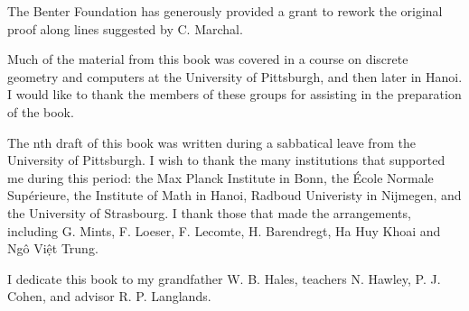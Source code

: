 The Benter Foundation has generously provided a grant to rework the original
proof along lines suggested by C. Marchal.

Much of the material from this book was covered
in a course on discrete geometry and computers at the University of
Pittsburgh, and then later %
in Hanoi.  I would like to thank the members of these
groups for assisting in the preparation of the book.

The nth draft of this book was written during a sabbatical leave from the
University of Pittsburgh.  I wish to thank the many institutions that
supported me during this period: the Max Planck Institute in Bonn, the
\'Ecole Normale Sup\'erieure, the Institute of Math in Hanoi, Radboud
Univeristy in Nijmegen, and the University of Strasbourg.  I thank
those that made the arrangements, including G. Mints, F. Loeser,
F. Lecomte, H. Barendregt, Ha Huy Khoai and Ng\^o Vi\d{\^e}t Trung.

I dedicate this book to my grandfather W. B. Hales, teachers N. Hawley, P. J. Cohen, and
advisor R. P. Langlands.
